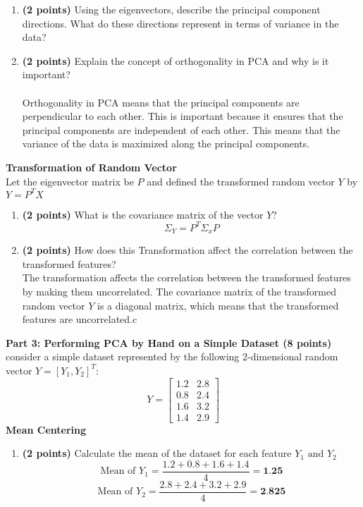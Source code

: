 \documentclass[a3paper,12pt]{extarticle} %
\begin{document}
\begin{enumerate}
\begin{enumerate}
    \item \textbf{(2 points)} Using the eigenvectors, describe the principal component directions. What do these directions represent in terms of variance in the data?
    \item \textbf{(2 points)} Explain the concept of orthogonality in PCA and why is it important?
    \\\\ Orthogonality in PCA means that the principal components are perpendicular to each other. This is important because it ensures that the principal components are independent of each other. This means that the variance of the data is maximized along the principal components.
    \end{enumerate}
    \subitem \textbf{Transformation of Random Vector}
    \\ Let the eigenvector matrix be \(P\) and defined the transformed random vector \(Y\) by \(Y = P^TX\)
    \begin{enumerate}
    \item \textbf{(2 points)} What is the covariance matrix of the  vector \(Y\)?
    \[
    \Sigma_Y = P^T\Sigma_xP
    \]
    \item \textbf{(2 points)} How does this Transformation affect the correlation between the transformed features?
    \\ The transformation affects the correlation between the transformed features by making them uncorrelated. The covariance matrix of the transformed random vector \(Y\) is a diagonal matrix, which means that the transformed features are uncorrelated.c
    \end{enumerate}
    \subitem \textbf{Part 3: Performing PCA by Hand on a Simple Dataset (8 points)}
    consider a simple dataset represented by the following 2-dimensional random vector \(Y = [Y_1, Y_2]^{T}\):
    \[
    Y = \begin{bmatrix}1.2 & 2.8\\0.8 & 2.4\\1.6 & 3.2\\1.4 & 2.9\end{bmatrix}
    \]
    \subitem \textbf{Mean Centering}
    \begin{enumerate}
        \item \textbf{(2 points)} Calculate the mean of the dataset for each feature \(Y_1 \text{ and } Y_2\)
        \[
        \text{Mean of } Y_1 = \frac{1.2 + 0.8 + 1.6 + 1.4}{4} = \textbf{1.25}
        \]
        \[
        \text{Mean of } Y_2 = \frac{2.8 + 2.4 + 3.2 + 2.9}{4} = \textbf{2.825}
\]
\end{enumerate}
\end{enumerate}
\end{document}
